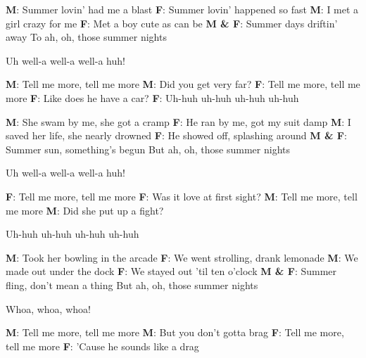 \begin{verse*}
\textbf{M}: Summer lovin' had me a blast
\textbf{F}: Summer lovin' happened so fast
\textbf{M}: I met a girl crazy for me
\textbf{F}: Met a boy cute as can be
\textbf{M \& F}: Summer days driftin' away
To ah, oh, those summer nights
\end{verse*}

\begin{verse*}
Uh well-a well-a well-a huh!
\end{verse*}

\begin{verse*}
\textbf{M}: Tell me more, tell me more
\textbf{M}: Did you get very far? 
\textbf{F}: Tell me more, tell me more
\textbf{F}: Like does he have a car?
\textbf{F}: Uh-huh uh-huh uh-huh uh-huh
\end{verse*}

\begin{verse*}
\textbf{M}: She swam by me, she got a cramp
\textbf{F}: He ran by me, got my suit damp
\textbf{M}: I saved her life, she nearly drowned
\textbf{F}: He showed off, splashing around
\textbf{M \& F}: Summer sun, something's begun
But ah, oh, those summer nights
\end{verse*}

\begin{verse*}
Uh well-a well-a well-a huh!
\end{verse*}

\begin{verse*}
\textbf{F}: Tell me more, tell me more
\textbf{F}: Was it love at first sight?
\textbf{M}: Tell me more, tell me more
\textbf{M}: Did she put up a fight?
\end{verse*}

\begin{verse*}
Uh-huh uh-huh uh-huh uh-huh
\end{verse*}

\begin{verse*}
\textbf{M}: Took her bowling in the arcade
\textbf{F}: We went strolling, drank lemonade
\textbf{M}: We made out under the dock
\textbf{F}: We stayed out 'til ten o'clock
\textbf{M \& F}: Summer fling, don't mean a thing
But ah, oh, those summer nights
\end{verse*}

\begin{verse*}
Whoa, whoa, whoa!
\end{verse*}

\begin{verse*}
\textbf{M}: Tell me more, tell me more
\textbf{M}: But you don't gotta brag
\textbf{F}: Tell me more, tell me more
\textbf{F}: 'Cause he sounds like a drag
\end{verse*}

